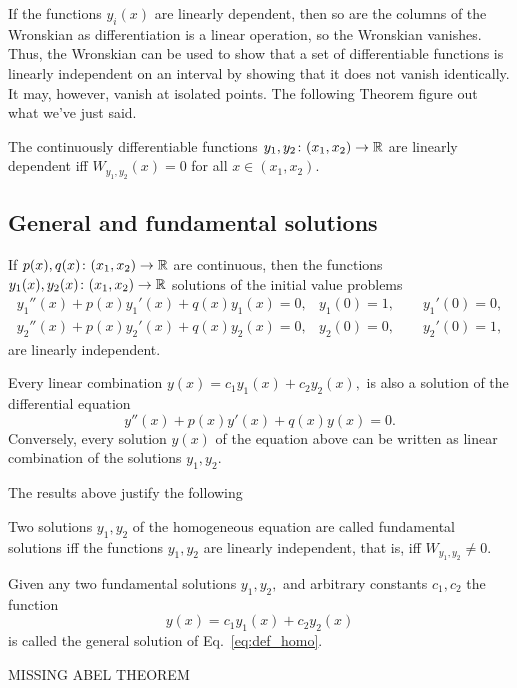 If the functions $ y_i(x) $ are linearly dependent, then so are the columns of the Wronskian as differentiation is a linear operation, so the Wronskian vanishes. Thus, the Wronskian can be used to show that a set of differentiable functions is linearly independent on an interval by showing that it does not vanish identically. It may, however, vanish at isolated points. 
The following Theorem figure out what we've just said.
\begin{thm}[Wronskian]
	The continuously differentiable functions $ y_1,y_2\colon (x_1,x_2)\to \mathbb{R} $ are linearly dependent iff $ W_{y_1,y_2}(x)=0 $ for all $ x\in (x_1,x_2). $
\end{thm}
\subsection{General and fundamental solutions}
\begin{thm}
	If $ p(x), q(x)\colon (x_1,x_2)\to \mathbb{R} $ are continuous, then the functions $ y_1(x),y_2(x)\colon (x_1,x_2)\to\mathbb{R} $ solutions of the initial value problems 
	\begin{align*}
		y_1''(x)+p(x)y_1'(x)+q(x)y_1(x)=0, & y_1(0)=1, \qquad y_1'(0)=0,\\
		y_2''(x)+p(x)y_2'(x)+q(x)y_2(x)=0, & y_2(0)=0, \qquad y_2'(0)=1, 
	\end{align*}
	are linearly independent.
\end{thm}
\begin{rmk}
	Every linear combination $ y(x)=c_1y_1(x)+c_2y_2(x), $ is also a solution of the differential equation
	\begin{equation}
	\label{eq:def_homo}
	y''(x)+p(x)y'(x)+q(x)y(x)=0.
	\end{equation}
	Conversely, every solution $ y(x) $ of the equation above can be written as linear combination of the solutions $ y_1,y_2. $
\end{rmk}
The results above justify the following 
\begin{mydef}
	Two solutions $ y_1,y_2 $ of the homogeneous equation are called fundamental solutions iff the functions $ y_1,y_2 $ are linearly independent, that is, iff $ W_{y_1,y_2}\neq 0. $
\end{mydef}
\begin{mydef}
	Given any two fundamental solutions $ y_1,y_2, $ and arbitrary constants $ c_1,c_2 $ the function
	\[y(x)=c_1y_1(x)+c_2y_2(x) \]
	is called the general solution of Eq.~\eqref{eq:def_homo}. 
\end{mydef}

\centering
{\Huge MISSING ABEL THEOREM}

